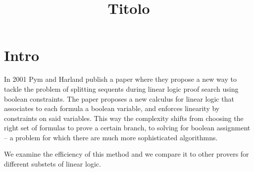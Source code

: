 \documentclass[a4paper, 12pt, tesi, english]{report}
\title{Titolo}
\begin{document}
\maketitle

\newpage

\tableofcontents

\chapter{Intro}
In 2001 Pym and Harland publish a paper \cite{HarlandPym} where they propose a new way to tackle the problem of splitting sequents during linear logic proof search using boolean constraints.
The paper proposes a new calculus for linear logic that associates to each formula a boolean variable, and enforces linearity by constraints on said variables.
This way the complexity shifts from choosing the right set of formulas to prove a certain branch, to solving for boolean assignment -- a problem for which there are much more sophisticated algorithmns.

We examine the efficiency of this method and we compare it to other provers for different substets of linear logic.
\end{document}
